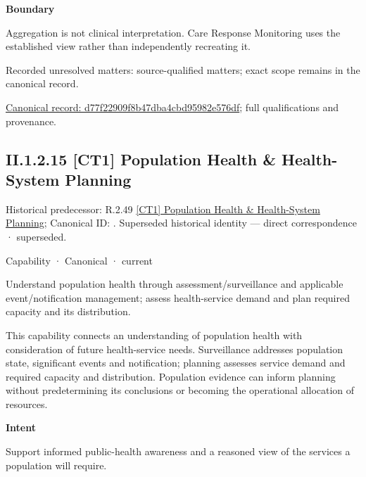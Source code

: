 \textbf{Boundary}



Aggregation is not clinical interpretation. Care Response Monitoring uses the established view rather than independently recreating it.


{\small Recorded unresolved matters: source-qualified matters; exact scope remains in the canonical record.}\par
{\footnotesize \href{../../../../continuum/strategy/capability/d77f22909f8b47dba4cbd95982e576df.md}{Canonical record: d77f22909f8b47dba4cbd95982e576df}; full qualifications and provenance.}\par
\subsection*{II.1.2.15 [CT1] Population Health \& Health-System Planning}
\label{navigation:II.1.2.15}

{\small Historical predecessor: R.2.49 \hyperref[element:a5003436a7f348b1bff60ba593adfa27]{[CT1] Population Health \& Health-System Planning}; Canonical ID: \texttt{}. Superseded historical identity — direct correspondence · superseded.}\par
\label{element:c63b38b37e9b4e9b97dc87ed54604def}
{\small Capability · Canonical · current}\par

Understand population health through assessment/surveillance and applicable event/notification management; assess health-service demand and plan required capacity and its distribution.



This capability connects an understanding of population health with consideration of future health-service needs. Surveillance addresses population state, significant events and notification; planning assesses service demand and required capacity and distribution. Population evidence can inform planning without predetermining its conclusions or becoming the operational allocation of resources.



\textbf{Intent}



Support informed public-health awareness and a reasoned view of the services a population will require.



